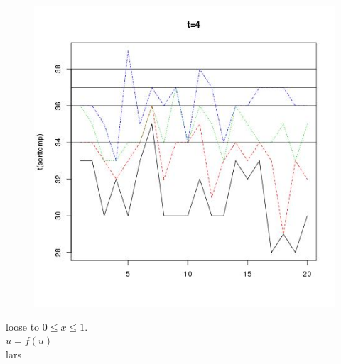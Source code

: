 \documentclass[xcolor=dvipsnames]{beamer}
\begin{document}
\begin{frame}\begin{figure}
\includegraphics[width=0.8\linewidth]{figure4.png}
\end{figure}\end{frame}
\begin{frame}
loose to $0\leqslant x\leqslant 1$.\\
$u=f(u)$\\
lars
\end{frame}
\end{document}
